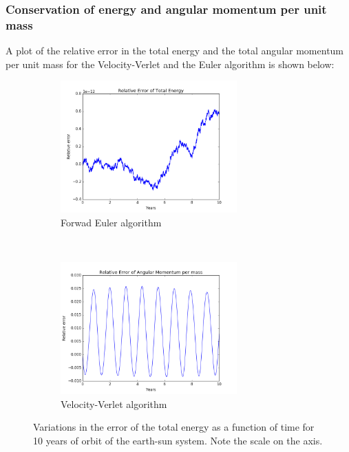\documentclass[a4paper, 10pt]{article}
\begin{document}
\subsubsection{Conservation of energy and angular momentum per unit mass}
A plot of the relative error in the total energy and the total angular momentum per unit mass for the Velocity-Verlet and the Euler algorithm is shown below:
\begin{figure}[t!]
    \centering
    \begin{subfigure}[t]{0.5\textwidth}
        \centering
        \includegraphics[height=2.0in]{relErrEnSEJx10.png}
        \caption{Forwad Euler algorithm}
    \end{subfigure}%
    ~ 
    \begin{subfigure}[t]{0.5\textwidth}
        \centering
        \includegraphics[height=2.0in]{relErrMomSEJx10.png}
        \caption{Velocity-Verlet algorithm}
    \end{subfigure}
    \caption{Variations in the error of the total energy as a function of time for 10 years of orbit of the earth-sun system. Note the scale on the axis.}
\end{figure}
\end{document}
